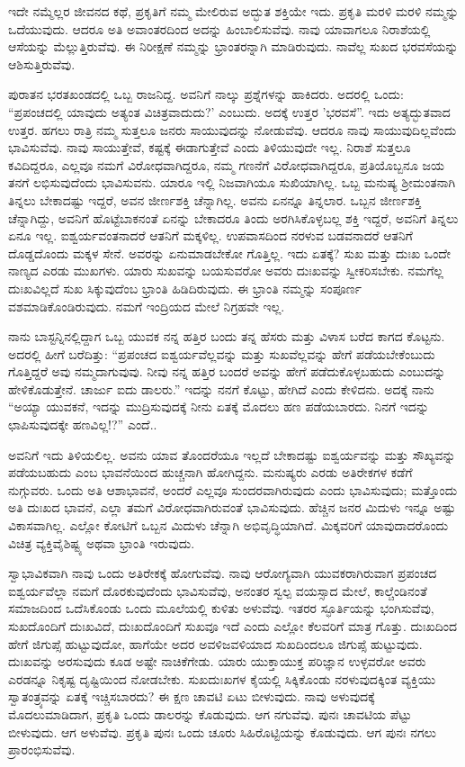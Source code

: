 ಇದೇ ನಮ್ಮೆಲ್ಲರ ಜೀವನದ ಕಥೆ, ಪ್ರಕೃತಿಗೆ ನಮ್ಮ ಮೇಲಿರುವ ಅದ್ಭುತ ಶಕ್ತಿಯೇ ಇದು. ಪ್ರಕೃತಿ ಮರಳಿ ಮರಳಿ ನಮ್ಮನ್ನು ಒದೆಯುವುದು. ಆದರೂ ಅತಿ ಅವಾಂತರದಿಂದ ಅದನ್ನು ಹಿಂಬಾಲಿಸುವೆವು. ನಾವು ಯಾವಾಗಲೂ ನಿರಾಶೆಯಲ್ಲಿ ಆಸೆಯನ್ನು ಮೆಲ್ಲುತ್ತಿರುವೆವು. ಈ ನಿರೀಕ್ಷಣೆ ನಮ್ಮನ್ನು ಭ್ರಾಂತರನ್ನಾಗಿ ಮಾಡಿರುವುದು. ನಾವೆಲ್ಲ ಸುಖದ ಭರವಸೆಯನ್ನು ಆಶಿಸುತ್ತಿರುವೆವು.

ಪುರಾತನ ಭರತಖಂಡದಲ್ಲಿ ಒಬ್ಬ ರಾಜನಿದ್ದ. ಅವನಿಗೆ ನಾಲ್ಕು ಪ್ರಶ್ನೆಗಳನ್ನು ಹಾಕಿದರು. ಅದರಲ್ಲಿ ಒಂದು: “ಪ್ರಪಂಚದಲ್ಲಿ ಯಾವುದು ಅತ್ಯಂತ ವಿಚಿತ್ರವಾದುದು?' ಎಂಬುದು. ಅದಕ್ಕೆ ಉತ್ತರ 'ಭರವಸೆ”. ಇದು ಅತ್ಯದ್ಭುತವಾದ ಉತ್ತರ. ಹಗಲು ರಾತ್ರಿ ನಮ್ಮ ಸುತ್ತಲೂ ಜನರು ಸಾಯುವುದನ್ನು ನೋಡುವೆವು. ಆದರೂ ನಾವು ಸಾಯುವುದಿಲ್ಲವೆಂದು ಭಾವಿಸುವೆವು. ನಾವು ಸಾಯುತ್ತೇವೆ, ಕಷ್ಟಕ್ಕೆ ಈಡಾಗುತ್ತೇವೆ ಎಂದು ತಿಳಿಯುವುದೇ ಇಲ್ಲ. ನಿರಾಶೆ ಸುತ್ತಲೂ ಕವಿದಿದ್ದರೂ, ಎಲ್ಲವೂ ನಮಗೆ ವಿರೋಧವಾಗಿದ್ದರೂ, ನಮ್ಮ ಗಣನೆಗೆ ವಿರೋಧವಾಗಿದ್ದರೂ, ಪ್ರತಿಯೊಬ್ಬನೂ ಜಯ ತನಗೆ ಲಭಿಸುವುದೆಂದು ಭಾವಿಸುವನು. ಯಾರೂ ಇಲ್ಲಿ ನಿಜವಾಗಿಯೂ ಸುಖಿಯಾಗಿಲ್ಲ. ಒಬ್ಬ ಮನುಷ್ಯ ಶ‍್ರೀಮಂತನಾಗಿ ತಿನ್ನಲು ಬೇಕಾದಷ್ಟು ಇದ್ದರೆ, ಅವನ ಜೀರ್ಣಶಕ್ತಿ ಚೆನ್ನಾಗಿಲ್ಲ. ಅವನು ಏನನ್ನೂ ತಿನ್ನಲಾರ. ಒಬ್ಬನ ಜೀರ್ಣಶಕ್ತಿ ಚೆನ್ನಾಗಿದ್ದು, ಅವನಿಗೆ ಹೊಟ್ಟೆಬಾಕನಂತೆ ಏನನ್ನು ಬೇಕಾದರೂ ತಿಂದು ಅರಗಿಸಿಕೊಳ್ಳಬಲ್ಲ ಶಕ್ತಿ ಇದ್ದರೆ, ಅವನಿಗೆ ತಿನ್ನಲು ಏನೂ ಇಲ್ಲ. ಐಶ್ವರ್ಯವಂತನಾದರೆ ಆತನಿಗೆ ಮಕ್ಕಳಿಲ್ಲ. ಉಪವಾಸದಿಂದ ನರಳುವ ಬಡವನಾದರೆ ಆತನಿಗೆ ದೊಡ್ಡದೊಂದು ಮಕ್ಕಳ ಸೇನೆ. ಅವರನ್ನು ಏನುಮಾಡಬೇಕೋ ಗೊತ್ತಿಲ್ಲ. ಇದು ಏತಕ್ಕೆ? ಸುಖ ಮತ್ತು ದುಃಖ ಒಂದೇ ನಾಣ್ಯದ ಎರಡು ಮುಖಗಳು. ಯಾರು ಸುಖವನ್ನು ಬಯಸುವರೋ ಅವರು ದುಃಖವನ್ನು ಸ್ವೀಕರಿಸಬೇಕು. ನಮಗೆಲ್ಲ ದುಃಖವಿಲ್ಲದೆ ಸುಖ ಸಿಕ್ಕುವುದೆಂಬ ಭ್ರಾಂತಿ ಹಿಡಿದಿರುವುದು. ಈ ಭ್ರಾಂತಿ ನಮ್ಮನ್ನು ಸಂಪೂರ್ಣ ವಶಮಾಡಿಕೊಂಡಿರುವುದು. ನಮಗೆ ಇಂದ್ರಿಯದ ಮೇಲೆ ನಿಗ್ರಹವೇ ಇಲ್ಲ.

ನಾನು ಬಾಸ್ಟನ್ನಿನಲ್ಲಿದ್ದಾಗ ಒಬ್ಬ ಯುವಕ ನನ್ನ ಹತ್ತಿರ ಬಂದು ತನ್ನ ಹೆಸರು ಮತ್ತು ವಿಳಾಸ ಬರೆದ ಕಾಗದ ಕೊಟ್ಟನು. ಅದರಲ್ಲಿ ಹೀಗೆ ಬರೆದಿತ್ತು: “ಪ್ರಪಂಚದ ಐಶ್ವರ್ಯವೆಲ್ಲವನ್ನು ಮತ್ತು ಸುಖವೆಲ್ಲವನ್ನು ಹೇಗೆ ಪಡೆಯಬೇಕೆಂಬುದು ಗೊತ್ತಿದ್ದರೆ ಅವು ನಮ್ಮದಾಗುವುವು. ನೀವು ನನ್ನ ಹತ್ತಿರ ಬಂದರೆ ಅವನ್ನು ಹೇಗೆ ಪಡೆದುಕೊಳ್ಳಬಹುದು ಎಂಬುದನ್ನು ಹೇಳಿಕೊಡುತ್ತೇನೆ. ಚಾರ್ಜು ಐದು ಡಾಲರು.” ಇದನ್ನು ನನಗೆ ಕೊಟ್ಟು, ಹೇಗಿದೆ ಎಂದು ಕೇಳಿದನು. ಅದಕ್ಕೆ ನಾನು “ಅಯ್ಯಾ ಯುವಕನೆ, ಇದನ್ನು ಮುದ್ರಿಸುವುದಕ್ಕೆ ನೀನು ಏತಕ್ಕೆ ಮೊದಲು ಹಣ ಪಡೆಯಬಾರದು. ನಿನಗೆ ಇದನ್ನು ಛಾಪಿಸುವುದಕ್ಕೇ ಹಣವಿಲ್ಲ!?” ಎಂದೆ..

ಅವನಿಗೆ ಇದು ತಿಳಿಯಲಿಲ್ಲ. ಅವನು ಯಾವ ತೊಂದರೆಯೂ ಇಲ್ಲದೆ ಬೇಕಾದಷ್ಟು ಐಶ್ವರ್ಯವನ್ನು ಮತ್ತು ಸೌಖ್ಯವನ್ನು ಪಡೆಯಬಹುದು ಎಂಬ ಭಾವನೆಯಿಂದ ಹುಚ್ಚನಾಗಿ ಹೋಗಿದ್ದನು. ಮನುಷ್ಯರು ಎರಡು ಅತಿರೇಕಗಳ ಕಡೆಗೆ ನುಗ್ಗುವರು. ಒಂದು ಅತಿ ಆಶಾಭಾವನೆ, ಅಂದರೆ ಎಲ್ಲವೂ ಸುಂದರವಾಗಿರುವುದು ಎಂದು ಭಾವಿಸುವುದು; ಮತ್ತೊಂದು ಅತಿ ದುಃಖದ ಭಾವನೆ, ಎಲ್ಲಾ ತಮಗೆ ವಿರೋಧವಾಗಿರುವಂತೆ ಭಾವಿಸುವುದು. ಹೆಚ್ಚಿನ ಜನರ ಮಿದುಳು ಇನ್ನೂ ಅಷ್ಟು ವಿಕಾಸವಾಗಿಲ್ಲ. ಎಲ್ಲೋ ಕೋಟಿಗೆ ಒಬ್ಬನ ಮಿದುಳು ಚೆನ್ನಾಗಿ ಅಭಿವೃದ್ಧಿಯಾಗಿದೆ. ಮಿಕ್ಕವರಿಗೆ ಯಾವುದಾದರೊಂದು ವಿಚಿತ್ರ ವ್ಯಕ್ತಿವೈಶಿಷ್ಟ್ಯ ಅಥವಾ ಭ್ರಾಂತಿ ಇರುವುದು.

ಸ್ವಾಭಾವಿಕವಾಗಿ ನಾವು ಒಂದು ಅತಿರೇಕಕ್ಕೆ ಹೋಗುವೆವು. ನಾವು ಆರೋಗ್ಯವಾಗಿ ಯುವಕರಾಗಿರುವಾಗ ಪ್ರಪಂಚದ ಐಶ್ವರ್ಯವೆಲ್ಲಾ ನಮಗೆ ದೊರಕುವುದೆಂದು ಭಾವಿಸುವೆವು, ಅನಂತರ ಸ್ವಲ್ಪ ವಯಸ್ಸಾದ ಮೇಲೆ, ಕಾಲ್ಚೆಂಡಿನಂತೆ ಸಮಾಜದಿಂದ ಒದೆಸಿಕೊಂಡು ಒಂದು ಮೂಲೆಯಲ್ಲಿ ಕುಳಿತು ಅಳುವೆವು. ಇತರರ ಸ್ಫೂರ್ತಿಯನ್ನು ಭಂಗಿಸುವೆವು, ಸುಖದೊಂದಿಗೆ ದುಃಖವಿದೆ, ದುಃಖದೊಂದಿಗೆ ಸುಖವೂ ಇದೆ ಎಂದು ಎಲ್ಲೋ ಕೆಲವರಿಗೆ ಮಾತ್ರ ಗೊತ್ತು. ದುಃಖದಿಂದ ಹೇಗೆ ಜಿಗುಪ್ಸೆ ಹುಟ್ಟುವುದೋ, ಹಾಗೆಯೇ ಅದರ ಅವಳಿಜವಳಿಯಾದ ಸುಖದಿಂದಲೂ ಜಿಗುಪ್ಸೆ ಹುಟ್ಟುವುದು. ದುಃಖವನ್ನು ಅರಸುವುದು ಕೂಡ ಅಷ್ಟೇ ನಾಚಿಕೆಗೇಡು. ಯಾರು ಯುಕ್ತಾಯುಕ್ತ ಪರಿಜ್ಞಾನ ಉಳ್ಳವರೋ ಅವರು ಎರಡನ್ನೂ ನಿಕೃಷ್ಟ ದೃಷ್ಟಿಯಿಂದ ನೋಡಬೇಕು. ಸುಖದುಃಖಗಳ ಕೈಯಲ್ಲಿ ಸಿಕ್ಕಿಕೊಂಡು ನರಳುವುದಕ್ಕಿಂತ ವ್ಯಕ್ತಿಯು ಸ್ವಾತಂತ್ರ್ಯವನ್ನು ಏತಕ್ಕೆ ಇಚ್ಚಿಸಬಾರದು? ಈ ಕ್ಷಣ ಚಾವಟಿ ಏಟು ಬೀಳುವುದು. ನಾವು ಅಳುವುದಕ್ಕೆ ಮೊದಲುಮಾಡಿದಾಗ, ಪ್ರಕೃತಿ ಒಂದು ಡಾಲರನ್ನು ಕೊಡುವುದು. ಆಗ ನಗುವೆವು. ಪುನಃ ಚಾವಟಿಯ ಪೆಟ್ಟು ಬೀಳುವುದು. ಆಗ ಅಳುವೆವು. ಪ್ರಕೃತಿ ಪುನಃ ಒಂದು ಚೂರು ಸಿಹಿರೊಟ್ಟಿಯನ್ನು ಕೊಡುವುದು. ಆಗ ಪುನಃ ನಗಲು ಪ್ರಾರಂಭಿಸುವೆವು.

